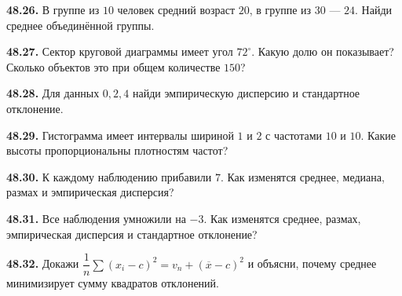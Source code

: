 \noindent\begin{minipage}[t]{\linewidth}\textbf{48.26.} В группе из \(10\) человек средний возраст \(20\), в группе из \(30\) --- \(24\). Найди среднее объединённой группы.\par\end{minipage}\par
\noindent\begin{minipage}[t]{\linewidth}\textbf{48.27.} Сектор круговой диаграммы имеет угол \(72^\circ\). Какую долю он показывает? Сколько объектов это при общем количестве \(150\)?\par\end{minipage}\par
\noindent\begin{minipage}[t]{\linewidth}\textbf{48.28.} Для данных \(0,2,4\) найди эмпирическую дисперсию и стандартное отклонение.\par\end{minipage}\par
\noindent\begin{minipage}[t]{\linewidth}\textbf{48.29.} Гистограмма имеет интервалы шириной \(1\) и \(2\) с частотами \(10\) и \(10\). Какие высоты пропорциональны плотностям частот?\par\end{minipage}\par
\noindent\begin{minipage}[t]{\linewidth}\textbf{48.30.}\starmark{} К каждому наблюдению прибавили \(7\). Как изменятся среднее, медиана, размах и эмпирическая дисперсия?\par\end{minipage}\par
\noindent\begin{minipage}[t]{\linewidth}\textbf{48.31.}\starmark{} Все наблюдения умножили на \(-3\). Как изменятся среднее, размах, эмпирическая дисперсия и стандартное отклонение?\par\end{minipage}\par
\noindent\begin{minipage}[t]{\linewidth}\textbf{48.32.}\starmark{} Докажи \(\dfrac1n\sum(x_i-c)^2=v_n+(\overline x-c)^2\) и объясни, почему среднее минимизирует сумму квадратов отклонений.\par\end{minipage}\par
\endgroup
